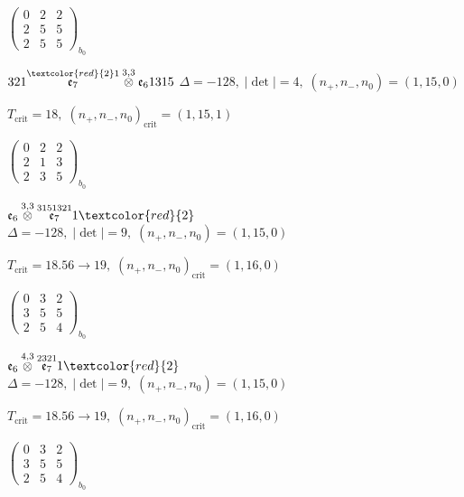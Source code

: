 \documentclass[10pt]{article}
\begin{document}
\hspace{2em}$\left(\begin{smallmatrix}0 & 2 & 2 \\ 2 & 5 & 5 \\ 2 & 5 & 5\end{smallmatrix}\right)_{\!b_0}$

\smallskip

$321\overset{\textcolor{red}{2}1}{\mathfrak{e}_7}\overset{3,3}{\otimes}\mathfrak{e}_61315$ \quad $\Delta=-128,\; |\det|=4,\; (n_+,n_-,n_0)=(1,15,0)$

\hspace{1em}$T_{\text{crit}}=18,\; (n_+,n_-,n_0)_{\text{crit}}=(1,15,1)$

\hspace{2em}$\left(\begin{smallmatrix}0 & 2 & 2 \\ 2 & 1 & 3 \\ 2 & 3 & 5\end{smallmatrix}\right)_{\!b_0}$

\smallskip

$\mathfrak{e}_6\overset{3,3}{\otimes}\overset{3151321}{\mathfrak{e}_7}1\textcolor{red}{2}$ \quad $\Delta=-128,\; |\det|=9,\; (n_+,n_-,n_0)=(1,15,0)$

\hspace{1em}$T_{\text{crit}}=18.56 \to 19,\; (n_+,n_-,n_0)_{\text{crit}}=(1,16,0)$

\hspace{2em}$\left(\begin{smallmatrix}0 & 3 & 2 \\ 3 & 5 & 5 \\ 2 & 5 & 4\end{smallmatrix}\right)_{\!b_0}$

\smallskip

$\mathfrak{e}_6\overset{4,3}{\otimes}\overset{2321}{\mathfrak{e}_7}1\textcolor{red}{2}$ \quad $\Delta=-128,\; |\det|=9,\; (n_+,n_-,n_0)=(1,15,0)$

\hspace{1em}$T_{\text{crit}}=18.56 \to 19,\; (n_+,n_-,n_0)_{\text{crit}}=(1,16,0)$

\hspace{2em}$\left(\begin{smallmatrix}0 & 3 & 2 \\ 3 & 5 & 5 \\ 2 & 5 & 4\end{smallmatrix}\right)_{\!b_0}$
\end{document}
